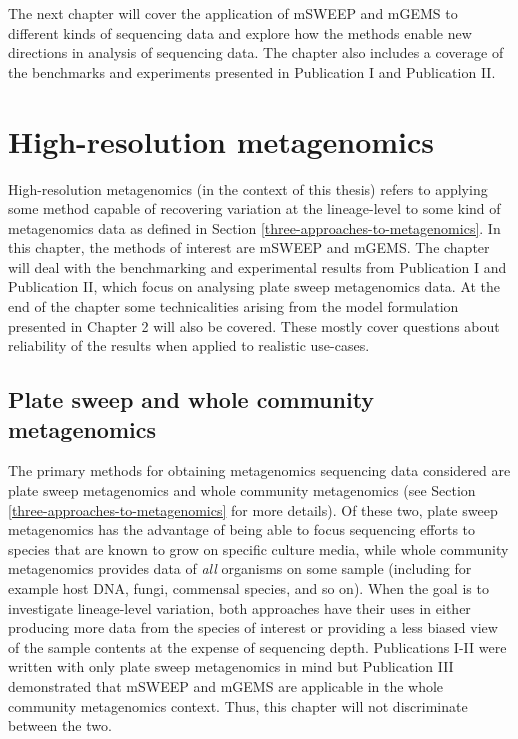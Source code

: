 \documentclass[officiallayout]{tktla}
\begin{document}
The next chapter will cover the application of mSWEEP and mGEMS to
different kinds of sequencing data and explore how the methods enable
new directions in analysis of sequencing data. The chapter also
includes a coverage of the benchmarks and experiments presented in
Publication I and Publication II.

\chapter{High-resolution metagenomics}
\label{high-resolution-metagenomics}

High-resolution metagenomics (in the context of this thesis) refers to
applying some method capable of recovering variation at the
lineage-level to some kind of metagenomics data as defined in
Section \ref{three-approaches-to-metagenomics}. In this chapter, the
methods of interest are mSWEEP and mGEMS. The chapter will deal with
the benchmarking and experimental results from Publication I and
Publication II, which focus on analysing plate sweep metagenomics
data. At the end of the chapter some technicalities arising from the
model formulation presented in Chapter 2 will also be covered. These
mostly cover questions about reliability of the results when applied
to realistic use-cases.

\section{Plate sweep and whole community metagenomics}

The primary methods for obtaining metagenomics sequencing data
considered are plate sweep metagenomics and whole community
metagenomics (see Section \ref{three-approaches-to-metagenomics} for
more details). Of these two, plate sweep metagenomics has the
advantage of being able to focus sequencing efforts to species that
are known to grow on specific culture media, while whole community metagenomics
provides data of \textit{all} organisms on some sample (including for
example host DNA, fungi, commensal species, and so on). When the goal
is to investigate lineage-level variation, both approaches have their
uses in either producing more data from the species of interest or
providing a less biased view of the sample contents at the expense of
sequencing depth. Publications I-II were written with only plate sweep
metagenomics in mind but Publication III demonstrated that mSWEEP and
mGEMS are applicable in the whole community metagenomics context. Thus, this
chapter will not discriminate between the two.
\end{document}
